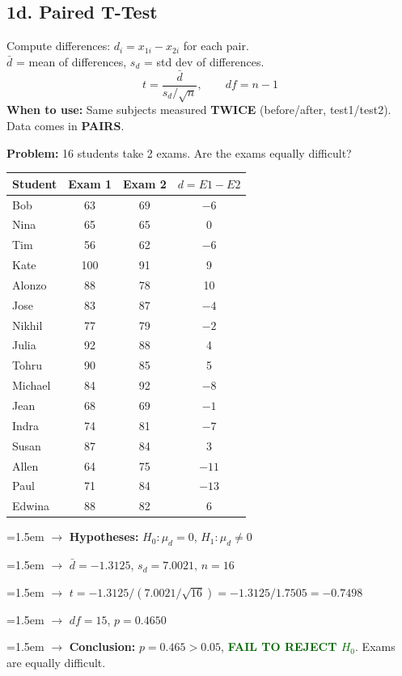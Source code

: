 \documentclass[11pt, letterpaper]{article}
\newcommand{\ans}[1]{\textbf{\textcolor{darkgreen}{#1}}}
\newcommand{\step}[1]{\par\hangindent=1.5em\hangafter=1 $\rightarrow$ #1}
\begin{document}
\subsection{1d. Paired T-Test}

\begin{formulabox}
Compute differences: $d_i = x_{1i} - x_{2i}$ for each pair.\\
$\bar{d}$ = mean of differences, \quad $s_d$ = std dev of differences.
\[ t = \frac{\bar{d}}{s_d / \sqrt{n}}, \qquad df = n - 1 \]
\textbf{When to use:} Same subjects measured \textbf{TWICE} (before/after, test1/test2). Data comes in \textbf{PAIRS}.
\end{formulabox}

\begin{examplebox}
\textbf{Problem:} 16 students take 2 exams. Are the exams equally difficult?

\begin{center}
\small
\begin{tabular}{lccc}
\toprule
\textbf{Student} & \textbf{Exam 1} & \textbf{Exam 2} & \textbf{$d = E1 - E2$} \\
\midrule
Bob & 63 & 69 & $-6$ \\
Nina & 65 & 65 & 0 \\
Tim & 56 & 62 & $-6$ \\
Kate & 100 & 91 & 9 \\
Alonzo & 88 & 78 & 10 \\
Jose & 83 & 87 & $-4$ \\
Nikhil & 77 & 79 & $-2$ \\
Julia & 92 & 88 & 4 \\
Tohru & 90 & 85 & 5 \\
Michael & 84 & 92 & $-8$ \\
Jean & 68 & 69 & $-1$ \\
Indra & 74 & 81 & $-7$ \\
Susan & 87 & 84 & 3 \\
Allen & 64 & 75 & $-11$ \\
Paul & 71 & 84 & $-13$ \\
Edwina & 88 & 82 & 6 \\
\bottomrule
\end{tabular}
\end{center}

\step{\textbf{Hypotheses:} $H_0: \mu_d = 0$, \quad $H_1: \mu_d \neq 0$}
\step{$\bar{d} = -1.3125$, $s_d = 7.0021$, $n = 16$}
\step{$t = -1.3125 / (7.0021/\sqrt{16}) = -1.3125 / 1.7505 = \mathbf{-0.7498}$}
\step{$df = 15$, $p = 0.4650$}
\step{\textbf{Conclusion:} $p = 0.465 > 0.05$, \ans{FAIL TO REJECT $H_0$}. Exams are equally difficult.}
\end{examplebox}
\end{document}
